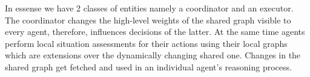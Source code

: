 In essense we have 2 classes of entities namely a coordinator and an executor. The coordinator changes the high-level
weights of the shared graph visible to every agent, therefore, influences decisions of the latter. At the same time
agents perform local situation assessments for their actions using their local graphs which are extensions over the
dynamically changing shared one. Changes in the shared graph get fetched and used in an individual agent's reasoning
process.

